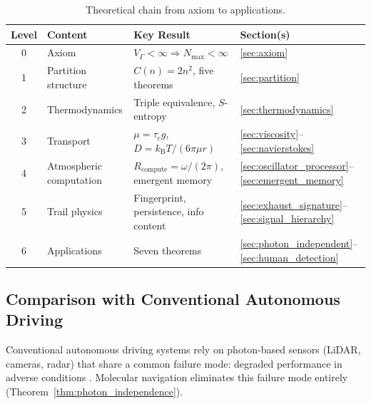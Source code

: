 \documentclass[11pt,twocolumn,a4paper]{article}
\theoremstyle{plain}
\theoremstyle{definition}
\theoremstyle{remark}
\newcommand{\kB}{k_{\mathrm{B}}}
\newcommand{\Rcompute}{R_{\mathrm{compute}}}
\newcommand{\VGamma}{V_{\Gamma}}
\newcommand{\Nmax}{N_{\mathrm{max}}}
\newcommand{\tauc}{\tau_{\mathrm{c}}}
\begin{document}
\begin{table}[h]
\centering
\caption{Theoretical chain from axiom to applications.}
\label{tab:levels}
\begin{tabular}{clll}
\toprule
\textbf{Level} & \textbf{Content} & \textbf{Key Result} & \textbf{Section(s)} \\
\midrule
0 & Axiom & $\VGamma < \infty \Rightarrow \Nmax < \infty$ & \ref{sec:axiom} \\
1 & Partition structure & $C(n) = 2n^2$, five theorems & \ref{sec:partition} \\
2 & Thermodynamics & Triple equivalence, $S$-entropy & \ref{sec:thermodynamics} \\
3 & Transport & $\mu = \tauc g$, $D = \kB T / (6\pi\mu r)$ & \ref{sec:viscosity}--\ref{sec:navierstokes} \\
4 & Atmospheric computation & $\Rcompute = \omega/(2\pi)$, emergent memory & \ref{sec:oscillator_processor}--\ref{sec:emergent_memory} \\
5 & Trail physics & Fingerprint, persistence, info content & \ref{sec:exhaust_signature}--\ref{sec:signal_hierarchy} \\
6 & Applications & Seven theorems & \ref{sec:photon_independent}--\ref{sec:human_detection} \\
\bottomrule
\end{tabular}
\end{table}

\subsection{Comparison with Conventional Autonomous Driving}

Conventional autonomous driving systems rely on photon-based sensors (LiDAR, cameras, radar) that share a common failure mode: degraded performance in adverse conditions \cite{thrun2006stanley, schwarting2018planning}. Molecular navigation eliminates this failure mode entirely (Theorem~\ref{thm:photon_independence}).
\end{document}
